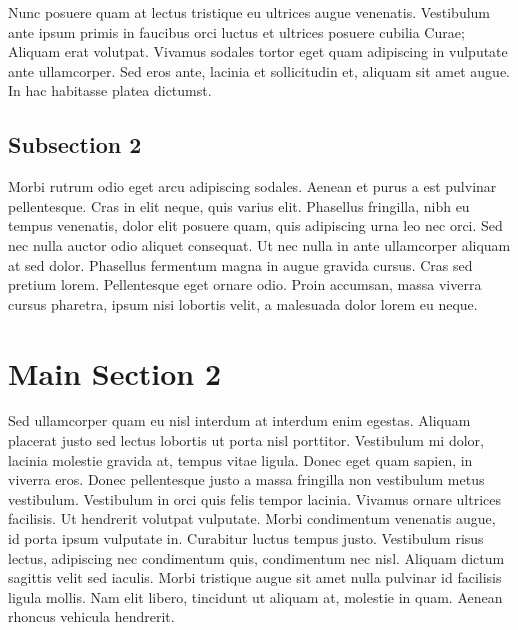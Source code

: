 Nunc posuere quam at lectus tristique eu ultrices augue venenatis. Vestibulum ante ipsum primis in faucibus orci luctus et ultrices posuere cubilia Curae; Aliquam erat volutpat. Vivamus sodales tortor eget quam adipiscing in vulputate ante ullamcorper. Sed eros ante, lacinia et sollicitudin et, aliquam sit amet augue. In hac habitasse platea dictumst.


\subsection{Subsection 2}
Morbi rutrum odio eget arcu adipiscing sodales. Aenean et purus a est pulvinar pellentesque. Cras in elit neque, quis varius elit. Phasellus fringilla, nibh eu tempus venenatis, dolor elit posuere quam, quis adipiscing urna leo nec orci. Sed nec nulla auctor odio aliquet consequat. Ut nec nulla in ante ullamcorper aliquam at sed dolor. Phasellus fermentum magna in augue gravida cursus. Cras sed pretium lorem. Pellentesque eget ornare odio. Proin accumsan, massa viverra cursus pharetra, ipsum nisi lobortis velit, a malesuada dolor lorem eu neque.


\section{Main Section 2}

Sed ullamcorper quam eu nisl interdum at interdum enim egestas. Aliquam placerat justo sed lectus lobortis ut porta nisl porttitor. Vestibulum mi dolor, lacinia molestie gravida at, tempus vitae ligula. Donec eget quam sapien, in viverra eros. Donec pellentesque justo a massa fringilla non vestibulum metus vestibulum. Vestibulum in orci quis felis tempor lacinia. Vivamus ornare ultrices facilisis. Ut hendrerit volutpat vulputate. Morbi condimentum venenatis augue, id porta ipsum vulputate in. Curabitur luctus tempus justo. Vestibulum risus lectus, adipiscing nec condimentum quis, condimentum nec nisl. Aliquam dictum sagittis velit sed iaculis. Morbi tristique augue sit amet nulla pulvinar id facilisis ligula mollis. Nam elit libero, tincidunt ut aliquam at, molestie in quam. Aenean rhoncus vehicula hendrerit.
